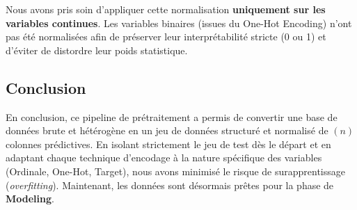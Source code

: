 \begin{tcolorbox}[title=Justification Stratégique]
	Nous avons pris soin d'appliquer cette normalisation \textbf{uniquement sur les variables continues}. Les variables binaires (issues du One-Hot Encoding) n'ont pas été normalisées afin de préserver leur interprétabilité stricte (0 ou 1) et d'éviter de distordre leur poids statistique.
\end{tcolorbox}

\subsection{Conclusion }
En conclusion, ce pipeline de prétraitement a permis de convertir une base de données brute et hétérogène en un jeu de données structuré et normalisé de $(n)$ colonnes prédictives. En isolant strictement le jeu de test dès le départ et en adaptant chaque technique d'encodage à la nature spécifique des variables (Ordinale, One-Hot, Target), nous avons minimisé le risque de surapprentissage (\textit{overfitting}). 
Maintenant, les données sont désormais prêtes pour la phase de \textbf{Modeling}.